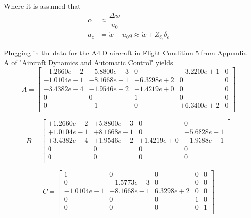 \documentclass[12pt]{article}
\begin{document}
\noindent Where it is assumed that
\begin{equation*}
\begin{split}
\alpha & \approx \dfrac{\Delta w}{u_0}\\
   a_z & = \dot{w} - u_0 q \approx \dot{w} + Z_{\delta_e} \delta_e
\end{split}
\end{equation*}

\noindent Plugging in the data for the A4-D aircraft in Flight Condition 5 from Appendix A of "Aircraft Dynamics and Automatic Control" yields
\begin{equation*}
A =
\begin{bmatrix}
  -1.2660e-2 & -5.8800e-3 &          0 & -3.2200e+1  &          0 \\
  -1.0104e-1 & -8.1668e-1 & +6.3298e+2 &          0  &          0 \\
  -3.4382e-4 & -1.9546e-2 & -1.4219e+0 &          0  &          0 \\
           0 &          0 &          1 &          0  &          0 \\
           0 &         -1 &          0 & +6.3400e+2  &          0 \\
\end{bmatrix}
\end{equation*}

\begin{equation*}
B =
\begin{bmatrix}
   +1.2660e-2 & +5.8800e-3 &          0 &          0 \\
   +1.0104e-1 & +8.1668e-1 &          0 & -5.6828e+1 \\
   +3.4382e-4 & +1.9546e-2 & +1.4219e+0 & -1.9388e+1 \\
            0 &          0 &          0 &          0 \\
            0 &          0 &          0 &          0 \\
\end{bmatrix}
\end{equation*}

\begin{equation*}
C =
\begin{bmatrix}
           1 &          0 & 0 & 0 & 0 \\
           0 & +1.5773e-3 & 0 & 0 & 0 \\
  -1.0104e-1 & -8.1668e-1 & 6.3298e+2 & 0 & 0 \\
           0 &          0 & 0 & 1 & 0 \\
           0 &          0 & 0 & 0 & 1 \\
\end{bmatrix}
\end{equation*}
\end{document}
